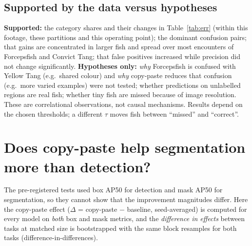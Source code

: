 \documentclass[11pt,a4paper]{article}
\begin{document}
\subsection*{Supported by the data versus hypotheses}
\textbf{Supported:} the category shares and their changes in Table~\ref{tab:err} (within this footage, these partitions and this
operating point); the dominant confusion pairs; that gains are concentrated in larger fish and spread over most encounters of
Forcepsfish and Convict Tang; that false positives increased while precision did not change significantly.
\textbf{Hypotheses only:} \emph{why} Forcepsfish is confused with Yellow Tang (e.g.\ shared colour) and \emph{why} copy-paste reduces
that confusion (e.g.\ more varied examples) were not tested; whether predictions on unlabelled regions are real fish; whether tiny
fish are missed because of image resolution. These are correlational observations, not causal mechanisms. Results depend on the
chosen thresholds; a different $\tau$ moves fish between ``missed'' and ``correct''.

\section{Does copy-paste help segmentation more than detection?}
The pre-registered tests used box AP50 for detection and mask AP50 for segmentation, so they cannot show that the improvement
magnitudes differ. Here the copy-paste effect ($\Delta$ = copy-paste $-$ baseline, seed-averaged) is computed for every model on
\emph{both} box and mask metrics, and the \emph{difference in effects} between tasks at matched size is bootstrapped with the same
block resamples for both tasks (difference-in-differences).

\begin{table}[H]\centering\caption{Copy-paste effect on focus-species mean AP, by task and size, and the difference in effects
(segmentation box $-$ detection box; $p$ in brackets). Last column: within segmentation, mask effect $-$ box effect.}\label{tab:task}
\footnotesize\setlength{\tabcolsep}{3pt}
\end{table}

\begin{table}[H]\centering\caption{Difference in copy-paste effect per species, segmentation box AP50 $-$ detection box AP50.}\label{tab:taskspecies}
\footnotesize{}\end{table}
\end{document}
